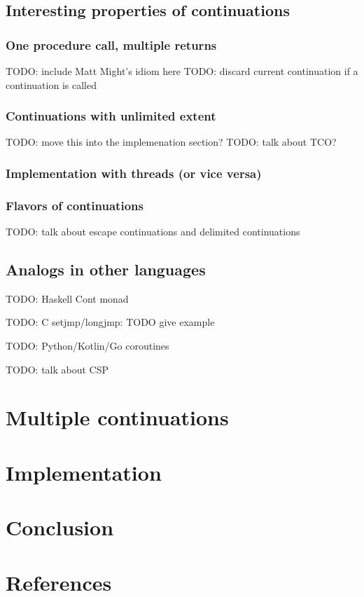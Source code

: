 \documentclass[]{article}
\begin{document}
\subsection{Interesting properties of continuations}
\label{sec:inte}

\subsubsection{One procedure call, multiple returns}
\label{sec:mult}

TODO: include Matt Might's idiom here
TODO: discard current continuation if a continuation is called

\subsubsection{Continuations with unlimited extent}
\label{sec:unli}

TODO: move this into the implemenation section?
TODO: talk about TCO?

\subsubsection{Implementation with threads (or vice versa)}
\label{sec:thre}

\subsubsection{Flavors of continuations}
\label{sec:flav}

TODO: talk about escape continuations and delimited continuations

\subsection{Analogs in other languages}
\label{sec:anal}

TODO: Haskell Cont monad

TODO: C setjmp/longjmp: TODO give example

TODO: Python/Kotlin/Go coroutines

TODO: talk about CSP %

\section{Multiple continuations}
\label{sec:mulc}



\section{Implementation}
\label{sec:impl}

\section{Conclusion}
\label{sec:conc}

\section{References}
\label{sec:refe}
\end{document}
